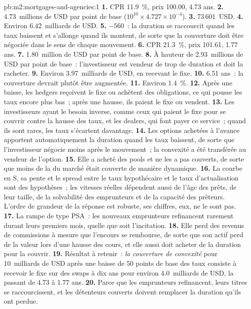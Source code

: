 \begin{solution}{pb:m2:mortgages-and-agencies:1}
\textbf{1.} CPR 11.9~\%, prix 100.00,  4.73 ans.
\textbf{2.} 4.73~millions de USD par point de base ($10^{10} \times 4.727 \times 10^{-4}$).
\textbf{3.} 73\,601~USD.
\textbf{4.} Environ 6.42~milliards de USD.
\textbf{5.} $-560$~: la duration se raccourcit quand les taux baissent et s'allonge
quand ils montent, de sorte que la couverture doit être négociée dans le sens de chaque mouvement.
\textbf{6.} CPR 21.3~\%, prix 101.61,  1.77 ans.
\textbf{7.} 1.80~million de USD par point de base.
\textbf{8.} À hauteur de 2.93~millions de USD par point de base~: l'investisseur est
vendeur de trop de duration et doit la racheter.
\textbf{9.} Environ 3.97~milliards de USD, en recevant le fixe.
\textbf{10.} 6.51 ans~: la couverture devrait plutôt être augmentée.
\textbf{11.} Environ 1.4~\%.
\textbf{12.} Après une baisse, les hedgers reçoivent le fixe ou achètent des obligations, ce qui pousse les taux
encore plus bas~; après une hausse, ils paient le fixe ou vendent.
\textbf{13.} Les investisseurs ayant le besoin inverse, comme ceux qui paient le fixe
pour se couvrir contre la hausse des taux, et les dealers, qui font payer ce service~; quand ils sont rares,
les taux s'écartent davantage.
\textbf{14.} Les options achetées à l'avance apportent automatiquement la duration quand
les taux baissent, de sorte que l'investisseur négocie moins après le mouvement~; la convexité a été
transférée au vendeur de l'option.
\textbf{15.} Elle a acheté des pools et ne les a pas couverts, de sorte que moins de la
 du marché était couverte de manière dynamique.
\textbf{16.} La courbe en S, sa pente et le spread entre le taux hypothécaire et le taux
d'actualisation sont des hypothèses~; les vitesses réelles dépendent aussi de l'âge des prêts, de leur taille, de la
solvabilité des emprunteurs et de la capacité des prêteurs. L'ordre de grandeur de la réponse est robuste,
ses chiffres, eux, ne le sont pas.
\textbf{17.} La rampe de type PSA~: les nouveaux emprunteurs refinancent rarement durant leurs premiers
mois, quelle que soit l'incitation.
\textbf{18.} Elle perd des revenus de commissions à mesure que l'encours se rembourse, de sorte que son actif perd de la valeur
lors d'une hausse des cours, et elle aussi doit acheter de la duration pour la couvrir.
\textbf{19.} Résultat à retenir~: \emph{la couverture de convexité} pour 10~milliards de USD après
une baisse de 50 points de base des taux consiste à recevoir le fixe sur des swaps à dix ans
pour environ 4.0~milliards de USD, la  passant de 4.73 à 1.77 ans.
\textbf{20.} Parce que les emprunteurs refinancent, leurs titres se raccourcissent, et les détenteurs couverts
doivent remplacer la duration qu'ils ont perdue.
\end{solution}

